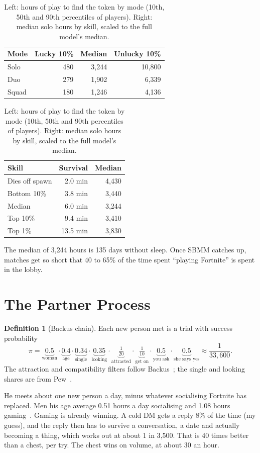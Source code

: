 \documentclass[11pt]{article}
\theoremstyle{definition}
\newtheorem{definition}{Definition}[section]
\theoremstyle{plain}
\begin{document}
\begin{table}[!htbp]
\centering\small
\caption{Left: hours of play to find the token by mode (10th, 50th and 90th percentiles of players). Right: median solo hours by skill, scaled to the full model's median.}
\label{tab:token}
\begin{tabular}[t]{lrrr}
\toprule
Mode & Lucky 10\% & Median & Unlucky 10\% \\
\midrule
Solo  & 480 & 3{,}244 & 10{,}800 \\
Duo   & 279 & 1{,}902 & 6{,}339 \\
Squad & 180 & 1{,}246 & 4{,}136 \\
\bottomrule
\end{tabular}
\qquad
\begin{tabular}[t]{lrr}
\toprule
Skill & Survival & Median \\
\midrule
Dies off spawn & 2.0 min & 4{,}430 \\
Bottom 10\% & 3.8 min & 3{,}440 \\
Median & 6.0 min & 3{,}244 \\
Top 10\% & 9.4 min & 3{,}410 \\
Top 1\% & 13.5 min & 3{,}830 \\
\bottomrule
\end{tabular}
\end{table}

The median of 3{,}244 hours is 135 days without sleep. Once SBMM catches up, matches get so short that 40 to 65\% of the time spent ``playing Fortnite'' is spent in the lobby.

\section{The Partner Process}

\begin{definition}[Backus chain]
Each new person met is a trial with success probability
\[
\pi = \underbrace{0.5}_{\text{woman}}\cdot\underbrace{0.4}_{\text{age}}\cdot\underbrace{0.34}_{\text{single}}\cdot\underbrace{0.35}_{\text{looking}}\cdot\underbrace{\tfrac{1}{20}}_{\text{attracted}}\cdot\underbrace{\tfrac{1}{10}}_{\text{get on}}\cdot\underbrace{0.5}_{\text{you ask}}\cdot\underbrace{0.5}_{\text{she says yes}} \approx \frac{1}{33{,}600}.
\]
The attraction and compatibility filters follow Backus~\cite{backus}; the single and looking shares are from Pew~\cite{pew23}.
\end{definition}

He meets about one new person a day, minus whatever socialising Fortnite has replaced. Men his age average 0.51 hours a day socialising and 1.08 hours gaming~\cite{atus}. Gaming is already winning. A cold DM gets a reply 8\% of the time (my guess), and the reply then has to survive a conversation, a date and actually becoming a thing, which works out at about 1 in 3{,}500. That is 40 times better than a chest, per try. The chest wins on volume, at about 30 an hour.
\end{document}
